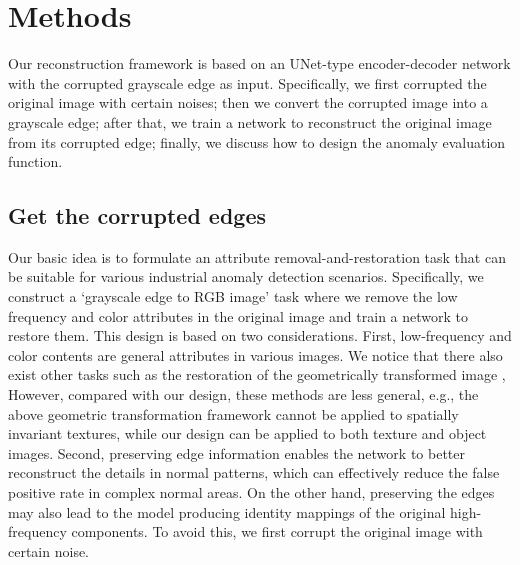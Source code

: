 \documentclass[5p, twocolumn]{elsarticle}[draft]
\begin{document}
\section{Methods}
\label{30}
Our reconstruction framework is based on an UNet-type encoder-decoder network with the corrupted grayscale edge as input. Specifically, we first corrupted the original image with certain noises; then we convert the corrupted image into a grayscale edge; after that, we train a network to reconstruct the original image from its corrupted edge; finally, we discuss how to design the anomaly evaluation function.

\subsection{Get the corrupted edges}
\label{3.1}
Our basic idea is to formulate an attribute removal-and-restoration task that can be suitable for various industrial anomaly detection scenarios. Specifically, we construct a `grayscale edge to RGB image' task where we remove the low frequency and color attributes in the original image and train a network to restore them. This design is based on two considerations. First, low-frequency and color contents are general attributes in various images. We notice that there also exist other tasks such as the restoration of the geometrically transformed image \cite{sohn2020learning,golan2018deep,hendrycks2019using, huang2019inverse}, However, compared with our design, these methods are less general, e.g., the above geometric transformation framework cannot be applied to spatially invariant textures, while our design can be applied to both texture and object images. Second, preserving edge information enables the network to better reconstruct the details in normal patterns, which can effectively reduce the false positive rate in complex normal areas. On the other hand, preserving the edges may also lead to the model producing identity mappings of the original high-frequency components. To avoid this, we first corrupt the original image with certain noise.
\end{document}
